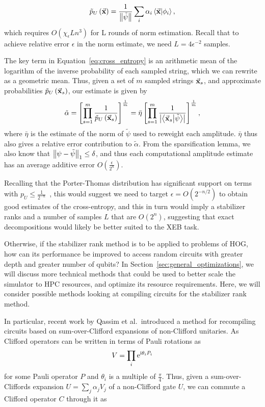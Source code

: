 \[\tilde{p}_{U}\left(\va{x}\right)=\frac{1}{\norm{\tilde{\psi}}}\sum_{i}\alpha_{i}\braket{\va{x}}{\phi_{i}},\]
which requires $O\left(\chi_{\epsilon}Ln^{3}\right)$ for L rounds of norm estimation. Recall that to achieve relative error $\epsilon$ in the norm estimate, we need $L=4\epsilon^{-2}$ samples.\par
The key term in Equation~\ref{eq:cross_entropy} is an arithmetic mean of the logarithm of the inverse probability of each sampled string, which we can rewrite as a geometric mean. Thus, given a set of $m$ sampled strings $\va{x}_{s}$, and approximate probabilities $\tilde{p}_{U}\left(\va{x}_{s}\right)$, our estimate is given by
\[\tilde{\alpha} = \left[\prod_{s=1}^{m} \frac{1}{\tilde{p}_{U}\left(\va{x}_{s}\right)} \right]^{\frac{1}{m}} = \bar{\eta}\left[\prod_{s=1}^{m} \frac{1}{\left|\braket{\va{x}_{s}}{\tilde{\psi}}\right|} \right]^{\frac{1}{m}},\]
where $\bar{\eta}$ is the estimate of the norm of $\tilde{\psi}$ used to reweight each amplitude. $\bar{\eta}$ thus also gives a relative error contribution to $\tilde{\alpha}$. From the sparsification lemma, we also know that $\norm{\psi-\tilde{\psi}}_{1}\leq \delta$, and thus each computational amplitude estimate has an average additive error $O(\frac{\epsilon}{2^{n}})$.\par
Recalling that the Porter-Thomas distribution has significant support on terms with $p_{U}\leq \frac{1}{2^{-n}}$~\cite{Boixo2016}, this would suggest we need to target $\epsilon = O\left(2^{-n/2}\right)$ to obtain good  estimates of the cross-entropy, and this in turn would imply a stabilizer ranks and a number of samples $L$ that are $O(2^{n})$, suggesting that exact decompositions would likely be better suited to the XEB task.\par
Otherwise, if the stabilizer rank method is to be applied to problems of HOG, how can its performance be improved to access random circuits with greater depth and greater number of qubits? In Section~\ref{sec:general_optimizations}, we will discuss more technical methods that could be used to better scale the simulator to HPC resources, and optimize its resource requirements. Here, we will consider possible methods looking at compiling circuits for the stabilizer rank method.\par
In particular, recent work by Qassim et al.\ introduced a method for recompiling circuits based on sum-over-Clifford expansions of non-Clifford unitaries. As Clifford operators can be written in terms of Pauli rotations as
\[V=\prod_{i} \mathrm{e}^{\mathrm{i} \theta_{i} P_{i}}\]
for some Pauli operator $P$ and $\theta_{i}$ is a multiple of $\frac{\pi}{4}$. Thus, given a sum-over-Cliffords expansion $U=\sum_{j}\alpha_{j}V_{j}$ of a non-Clifford gate $U$, we can commute a Clifford operator $C$ through it as~\cite{Qassim2019}
